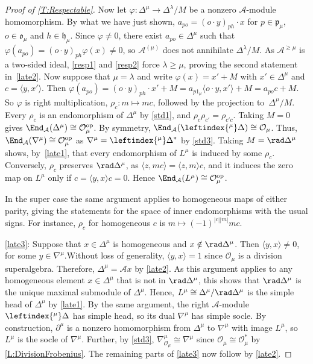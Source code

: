 \documentclass[a4paper,11pt]{amsart}
\let\<\langle
\let\>\rangle
\numberwithin{equation}{subsection}
\theoremstyle{definition}
\theoremstyle{theorem}
\theoremstyle{remark}
\newcommand\CA{\mathcal{A}}
\newcommand\CO{\mathcal{O}}
\newcommand\plam[1][\lambda]{\mathfrak{p}_{#1}}
\newcommand\hlam[1][\lambda]{\mathfrak{h}_{#1}}
\newcommand\Olam[1][\lambda]{\CO_{#1}}
\newcommand\olam[1][\lambda]{\mathfrak{o}_{#1}}
\begin{document}
\begin{proof}[Proof of \autoref{T:Respectable}]
     Now let $\varphi\colon\Delta^\mu\to\Delta^\lambda/M$ be a nonzero
     $\CA$-module homomorphism. By what we have just shown,  $a_{po}=(o\cdot y)_{ph}\cdot x$
     for $p\in\plam[\mu]$, $o\in\olam[\mu]$ and $h\in\hlam[\mu]$. Since
     $\varphi\ne0$, there exist $a_{po}\in\Delta^\mu$ such that
     $\varphi(a_{po})=(o\cdot y)_{ph}\varphi(x)\ne0$, so $\CA^{(\mu)}$ does not annihilate
     $\Delta^\lambda/M$. As $\CA^{\ge\mu}$ is a two-sided ideal, \autoref{resp1} and \autoref{resp2}
     force $\lambda\ge\mu$, proving the second statement in~\autoref{late2}.
     Now suppose that $\mu=\lambda$ and write $\varphi(x)=x'+M$ with $x'\in\Delta^\mu$ and $c=\<y,x'\>$.
     Then $\varphi(a_{po})=(o\cdot y)_{ph}\cdot x'+M=a_{p1_\mu}\<o\cdot y,x'\>+M=a_{po}c+M$.
     So $\varphi$ is right multiplication, $\rho_c\colon m\mapsto mc$, followed by the projection
     to~$\Delta^\mu/M$. Every $\rho_c$ is an endomorphism of $\Delta^\mu$ by \autoref{std1}, and
     $\rho_c\rho_{c'}=\rho_{c'c}$. Taking $M=0$ gives $\End_{\CA}(\Delta^\mu)\cong\Olam[\mu]^{\mathrm{op}}$.
     By symmetry, $\End_{\CA}(\leftindex{^\mu}\Delta)\cong\Olam[\mu]$. Thus, $\End_{\CA}(\nabla^\mu)\cong\Olam[\mu]^{\mathrm{op}}$
     as $\nabla^\mu=\leftindex{^\mu}\Delta^*$ by \autoref{std3}. Taking $M=\rad\Delta^\mu$ shows, by~\autoref{late1}, that every
     endomorphism of $L^\mu$ is induced by some $\rho_c$.  Conversely, $\rho_c$ preserves $\rad\Delta^\mu$,
     as $\<z,mc\>=\<z,m\>c$, and it induces the zero map on $L^\mu$ only if $c=\<y,x\>c=0$. Hence
     $\End_{\CA}(L^\mu)\cong\Olam[\mu]^{\mathrm{op}}$.

     In the super case the same argument applies to homogeneous maps of
     either parity,  giving the statements for the space of inner
     endomorphisms with the usual signs. For instance, $\rho_c$ for
     homogeneous $c$ is  $m\mapsto(-1)^{|c||m|}mc$.

     \autoref{late3}:
     Suppose that $x\in\Delta^\mu$ is homogeneous and $x\notin\rad\Delta^\mu$. Then
     $\<y,x\>\ne0$, for some $y\in\nabla^\mu$.Without loss of
     generality, $\<y,x\>=1$ since $\Olam[\mu]$ is a division superalgebra.
     Therefore, $\Delta^\mu=\CA x$ by \autoref{late2}.
     As this argument applies to any homogeneous element
     $x\in\Delta^\mu$ that is not in $\rad\Delta^\mu$, this shows that
     $\rad\Delta^\mu$ is the unique maximal submodule of
     $\Delta^\mu$. Hence, $L^\mu\cong\Delta^\mu/\rad\Delta^\mu$ is the
     simple head of $\Delta^\mu$ by \autoref{late1}. By the same
     argument, the right $\CA$-module $\leftindex{^\mu}\Delta$ has
     simple head, so its dual $\nabla^\mu$ has simple socle. By
     construction, $\partial^\mu$ is a nonzero homomorphism from
     $\Delta^\mu$ to $\nabla^\mu$ with image $L^\mu$, so $L^\mu$ is the
     socle of $\nabla^\mu$. Further, by \autoref{std3},
     $\nabla^\mu_{\Olam[\mu]}\cong\nabla^\mu$ since
     $\Olam[\mu]\cong\Olam[\mu]^*$ by \autoref{L:DivisionFrobenius}.
     The remaining parts of \autoref{late3} now follow by
     \autoref{late2}.


\end{proof}
\end{document}
